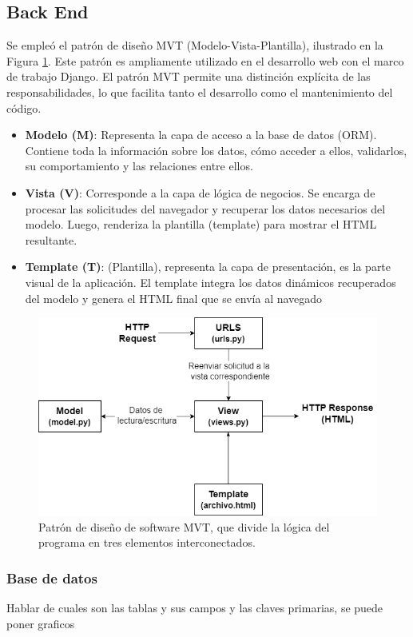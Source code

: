 \subsection{Back End}\label{sec:back_end}

Se empleó el patrón de diseño MVT (Modelo-Vista-Plantilla), ilustrado en la Figura \ref{fig:patronMVT}. Este patrón es ampliamente utilizado en el desarrollo web con el marco de trabajo Django. El patrón MVT permite una distinción explícita de las responsabilidades, lo que facilita tanto el desarrollo como el mantenimiento del código.

\begin{itemize}
    \item \textbf{Modelo (M)}: Representa la capa de acceso a la base de datos (ORM). Contiene toda la información sobre los datos, cómo acceder a ellos, validarlos, su comportamiento y las relaciones entre ellos.
    \item \textbf{Vista (V)}:  Corresponde a la capa de lógica de negocios. Se encarga de procesar las solicitudes del navegador y recuperar los datos necesarios del modelo. Luego, renderiza la plantilla (template) para mostrar el HTML resultante.
    \item \textbf{Template (T)}: (Plantilla), representa la capa de presentación, es la parte visual de la aplicación. El template integra los datos dinámicos recuperados del modelo y genera el HTML final que se envía al navegado

\end{itemize}
\begin{figure}[H]
    \centering
    \includegraphics[width=0.8\linewidth]{Figuras/AplicacionWeb/backend/patronMVT.png}
    \caption{Patrón de diseño de software MVT, que divide la lógica del programa en tres elementos interconectados.}
    \label{fig:patronMVT}
\end{figure}


\subsubsection{Base de datos}
Hablar de cuales son las tablas y sus campos y las claves primarias, se puede poner graficos

